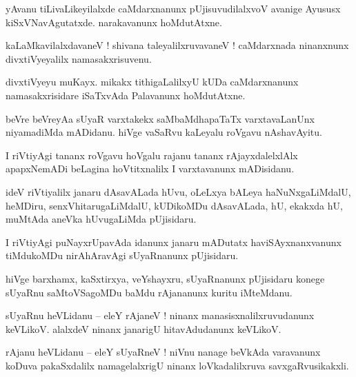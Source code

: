 \documentclass{article}
\begin{document}
\begin{mng}%
yAvanu tiLivaLikeyilalxde caMdarxnanunx pUjisuvudilalxvoV avanige Ayususx kiSxVNavAgutatxde. 
narakavanunx hoMdutAtxne.
\end{mng}

\begin{mng}%
kaLaMkavilalxdavaneV ! shivana taleyalilxruvavaneV ! caMdarxnada ninanxnunx divxtiVyeyalilx 
namasakxrisuvenu.
\end{mng}

\begin{mng}%
divxtiVyeyu muKayx. mikakx tithigaLalilxyU kUDa caMdarxnanunx namasakxrisidare iSaTxvAda 
Palavanunx hoMdutAtxne.
\end{mng}

\begin{mng}%
beVre  beVreyAa sUyaR varxtakekx saMbaMdhapaTaTx varxtavaLanUnx niyamadiMda mADidanu. hiVge 
vaSaRvu kaLeyalu roVgavu nAshavAyitu.
\end{mng}

\begin{mng}%
I riVtiyAgi tananx roVgavu hoVgalu rajanu tananx rAjayxdalelxlAlx apapxNemADi beLagina 
hoVtitxnalilx I  varxtavanunx mADisidanu.
\end{mng}

\begin{mng}%
ideV riVtiyalilx janaru dAsavALada hUvu, oLeLxya bALeya haNuNxgaLiMdalU, heMDiru, 
senxVhitarugaLiMdalU, kUDikoMDu dAsavALada, hU, ekakxda hU, muMtAda aneVka hUvugaLiMda pUjisidaru.
\end{mng}

\begin{mng}%
I riVtiyAgi puNayxrUpavAda idanunx janaru mADutatx haviSAyxnanxvanunx tiMdukoMDu nirAhAravAgi 
sUyaRnanunx pUjisidaru.
\end{mng}

\begin{mng}%
hiVge barxhamx, kaSxtirxya, veYshayxru, sUyaRnanunx pUjisidaru konege sUyaRnu saMtoVSagoMDu baMdu 
rAjananunx kuritu iMteMdanu.
\end{mng}

\begin{mng}%
sUyaRnu heVLidanu -- eleY rAjaneV ! ninanx manasisxnalilxruvudanunx keVLikoV. alalxdeV ninanx 
janarigU hitavAdudanunx keVLikoV.
\end{mng}

\begin{mng}%
rAjanu heVLidanu -- eleY sUyaRneV ! niVnu nanage beVkAda varavanunx koDuva pakaSxdalilx 
namagelalxrigU ninanx loVkadalilxruva savxgaRvusikakxli.
\end{mng}
\end{document}
